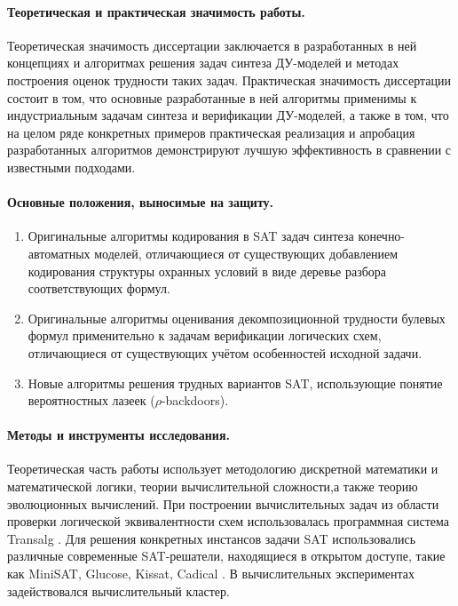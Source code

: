 \paragraph*{Теоретическая и практическая значимость работы.}
%
Теоретическая значимость диссертации заключается в разработанных в ней концепциях и алгоритмах решения задач синтеза ДУ-моделей и методах построения оценок трудности таких задач.
Практическая значимость диссертации состоит в том, что основные разработанные в ней алгоритмы применимы к индустриальным задачам синтеза и верификации ДУ-моделей, а также в том, что на целом ряде конкретных примеров практическая реализация и апробация разработанных  алгоритмов демонстрируют лучшую эффективность в сравнении с известными подходами.


\paragraph*{Основные положения, выносимые на защиту.}
%
\begin{enumerate}[beginpenalty=10000]
    \item Оригинальные алгоритмы кодирования в SAT задач синтеза конечно-автоматных моделей, отличающиеся от существующих добавлением кодирования структуры охранных условий в виде деревье разбора соответствующих формул.

    \item Оригинальные алгоритмы оценивания декомпозиционной трудности булевых формул применительно к задачам верификации логических схем, отличающиеся от существующих учётом особенностей исходной задачи.

    \item Новые алгоритмы решения трудных вариантов SAT, использующие понятие вероятностных лазеек ($\rho$-backdoors).


\end{enumerate}


\paragraph*{Методы и инструменты исследования.}
%
Теоретическая часть работы использует методологию дискретной математики и математической логики, теории вычислительной сложности,а также теорию эволюционных вычислений.
 
При построении вычислительных задач из области проверки логической эквивалентности схем использовалась программная система Transalg .
Для решения конкретных инстансов задачи SAT использовались различные современные SAT-решатели, находящиеся в открытом доступе, такие как MiniSAT, Glucose, Kissat, Cadical .
В вычислительных экспериментах задействовался вычислительный кластер.


